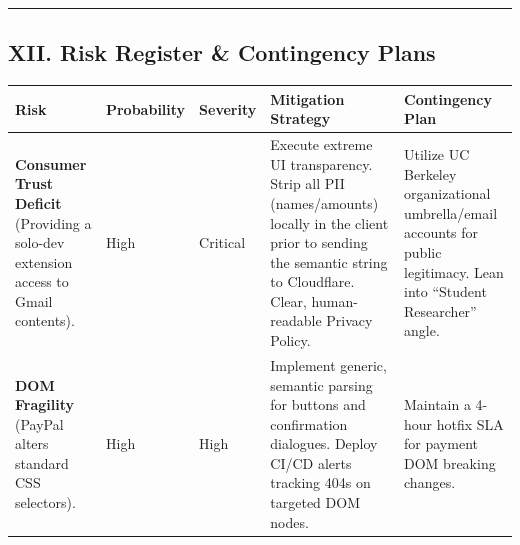\documentclass[
]{article}
\newcounter{none} %
\begin{document}
\begin{center}\rule{0.5\linewidth}{0.5pt}\end{center}

\subsection{XII. Risk Register \& Contingency
Plans}\label{xii.-risk-register-contingency-plans}

{\def\LTcaptype{none} %
\begin{longtable}[]{@{}
  >{\raggedright\arraybackslash}p{}
  >{\raggedright\arraybackslash}p{}
  >{\raggedright\arraybackslash}p{}
  >{\raggedright\arraybackslash}p{}
  >{\raggedright\arraybackslash}p{}@{}}
\toprule\noalign{}
\begin{minipage}[b]{\linewidth}\raggedright
Risk
\end{minipage} & \begin{minipage}[b]{\linewidth}\raggedright
Probability
\end{minipage} & \begin{minipage}[b]{\linewidth}\raggedright
Severity
\end{minipage} & \begin{minipage}[b]{\linewidth}\raggedright
Mitigation Strategy
\end{minipage} & \begin{minipage}[b]{\linewidth}\raggedright
Contingency Plan
\end{minipage} \\
\midrule\noalign{}
\endhead
\bottomrule\noalign{}
\endlastfoot
\textbf{Consumer Trust Deficit} (Providing a solo-dev extension access
to Gmail contents). & High & Critical & Execute extreme UI transparency.
Strip all PII (names/amounts) locally in the client prior to sending the
semantic string to Cloudflare. Clear, human-readable Privacy Policy. &
Utilize UC Berkeley organizational umbrella/email accounts for public
legitimacy. Lean into ``Student Researcher'' angle. \\
\textbf{DOM Fragility} (PayPal alters standard CSS selectors). & High &
High & Implement generic, semantic parsing for buttons and confirmation
dialogues. Deploy CI/CD alerts tracking 404s on targeted DOM nodes. &
Maintain a 4-hour hotfix SLA for payment DOM breaking changes. \\

\end{longtable}}
\end{document}
